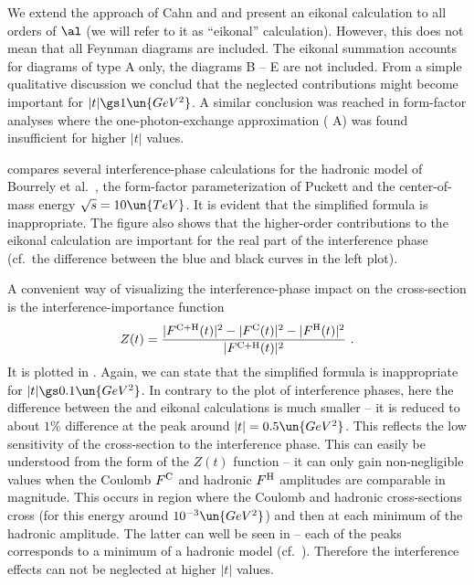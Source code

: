 We extend the approach of Cahn and \KaL{} and present an eikonal calculation to all orders of $\al$ (we will refer to it as ``eikonal'' calculation). However, this does not mean that all Feynman diagrams are included. The eikonal summation accounts for diagrams of type  A only, the diagrams B -- E are not included. From a simple qualitative discussion we conclud that the neglected contributions might become important for $|t| \gs 1\un{GeV^2}$. A similar conclusion was reached in form-factor analyses  where the one-photon-exchange approximation ( A) was found insufficient for higher $|t|$ values.


 compares several interference-phase calculations for the hadronic model of Bourrely et al.~, the form-factor parameterization of Puckett  and the center-of-mass energy $\sqrt s = 10 \un{TeV}$. It is evident that the simplified \WaY{} formula is inappropriate. The figure also shows that the higher-order contributions to the eikonal calculation are important for the real part of the interference phase (cf.~the difference between the blue and black curves in the left plot).



A convenient way of visualizing the interference-phase impact on the cross-section is the interference-importance function
$$Z(t) = {|F^{\rm C+H}(t)|^2 - |F^{\rm C}(t)|^2 - |F^{\rm H}(t)|^2\over |F^{\rm C+H}(t)|^2}\ .$$
It is plotted in . Again, we can state that the simplified \WaY{} formula is inappropriate for $|t| \gs 0.1\un{GeV^2}$. In contrary to the plot of interference phases, here the difference between the \KaL{} and eikonal calculations is much smaller -- it is reduced to about $1\%$ difference at the peak around $|t| = 0.5\un{GeV^2}$. This reflects the low sensitivity of the cross-section to the interference phase. This can easily be understood from the form of the $Z(t)$ function -- it can only gain non-negligible values when the Coulomb $F^{\rm C}$ and hadronic $F^{\rm H}$ amplitudes are comparable in magnitude. This occurs in region where the Coulomb and hadronic cross-sections cross (for this energy around $10^{-3}\un{GeV^2}$) and then at each minimum of the hadronic amplitude. The latter can well be seen in  -- each of the peaks corresponds to a minimum of a hadronic model (cf.~). Therefore the interference effects can not be neglected at higher $|t|$ values.


